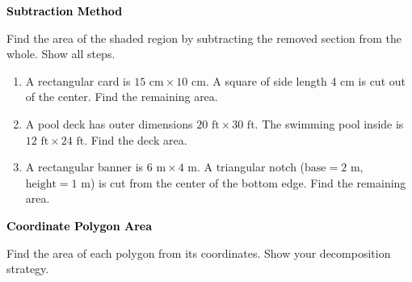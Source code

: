 \documentclass[12pt, letterpaper, fleqn]{article}
\begin{document}
\newpage

\begin{tcolorbox}[colback=black!10]
\large\textcolor{black}{\textbf{Subtraction Method}}
\end{tcolorbox}

\noindent
Find the area of the shaded region by subtracting the removed section from the whole. Show all steps.

\vspace{3mm}

\begin{enumerate}[itemsep=2.2cm, leftmargin=0.6cm]

\item A rectangular card is $15\text{ cm} \times 10\text{ cm}$. A square of side length 4 cm is cut out of the center. Find the remaining area.

\vspace{2cm}

\item A pool deck has outer dimensions $20\text{ ft} \times 30\text{ ft}$. The swimming pool inside is $12\text{ ft} \times 24\text{ ft}$. Find the deck area.

\vspace{2cm}

\item A rectangular banner is $6\text{ m} \times 4\text{ m}$. A triangular notch ($\text{base} = 2\text{ m}$, $\text{height} = 1\text{ m}$) is cut from the center of the bottom edge. Find the remaining area.

\vspace{2cm}

\end{enumerate}

\newpage

\begin{tcolorbox}[colback=black!10]
\large\textcolor{black}{\textbf{Coordinate Polygon Area}}
\end{tcolorbox}

\noindent
Find the area of each polygon from its coordinates. Show your decomposition strategy.

\vspace{3mm}
\end{document}
